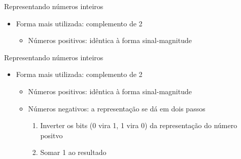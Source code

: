\documentclass[t, aspectratio=169]{beamer}
\begin{document}
\begin{frame}[label={sec:orgf226c8f}]{Representando números inteiros}
\begin{itemize}
\item Forma mais utilizada: \alert{complemento de 2}
\begin{itemize}
\item Números positivos: idêntica à forma sinal-magnitude
\end{itemize}
\end{itemize}
\end{frame}

\begin{frame}[label={sec:orgf7d43a9}]{Representando números inteiros}
\begin{itemize}
\item Forma mais utilizada: \alert{complemento de 2}
\begin{itemize}
\item Números positivos: idêntica à forma sinal-magnitude
\item Números negativos: a representação se dá em dois passos
\begin{enumerate}
\item Inverter os bits (0 vira 1, 1 vira 0) da representação do número positvo
\item Somar 1 ao resultado
\end{enumerate}
\end{itemize}
\end{itemize}
\end{frame}
\end{document}
